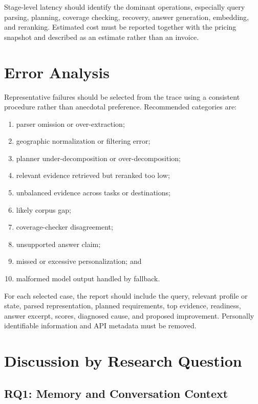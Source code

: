 Stage-level latency should identify the dominant operations, especially query
parsing, planning, coverage checking, recovery, answer generation, embedding,
and reranking. Estimated cost must be reported together with the pricing
snapshot and described as an estimate rather than an invoice.

\section{Error Analysis}

Representative failures should be selected from the trace using a consistent
procedure rather than anecdotal preference. Recommended categories are:

\begin{enumerate}
    \item parser omission or over-extraction;
    \item geographic normalization or filtering error;
    \item planner under-decomposition or over-decomposition;
    \item relevant evidence retrieved but reranked too low;
    \item unbalanced evidence across tasks or destinations;
    \item likely corpus gap;
    \item coverage-checker disagreement;
    \item unsupported answer claim;
    \item missed or excessive personalization; and
    \item malformed model output handled by fallback.
\end{enumerate}

For each selected case, the report should include the query, relevant profile
or state, parsed representation, planned requirements, top evidence, readiness,
answer excerpt, scores, diagnosed cause, and proposed improvement. Personally
identifiable information and API metadata must be removed.

\section{Discussion by Research Question}

\subsection{RQ1: Memory and Conversation Context}

